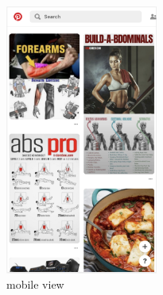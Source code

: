\documentclass{42-en}
\begin{document}
\begin{figure}[H]
    \begin{center}
        \includegraphics[width=5cm]{pinterest-mobile.png}\\
        mobile view
    \end{center}
\end{figure}
\end{document}

